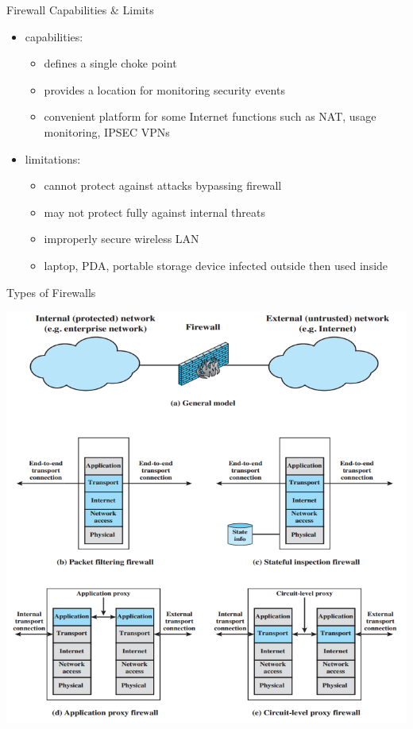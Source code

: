 \documentclass{beamer}
\begin{document}
\begin{frame}{Firewall Capabilities \& Limits}
  \begin{itemize}
  \item capabilities: 
    \begin{itemize}
    \item defines a single choke point 
    \item provides a location for monitoring security events 
    \item convenient platform for some Internet functions such as 
    NAT, usage monitoring, IPSEC VPNs 
    \end{itemize}
  \item limitations: 
    \begin{itemize}
    \item cannot protect against attacks bypassing firewall 
    \item may not protect fully against internal threats 
    \item improperly secure wireless LAN 
    \item laptop, PDA, portable storage device infected outside 
    then used inside
    \end{itemize}
  \end{itemize}
\end{frame}

\begin{frame}{Types of Firewalls}
  
  \begin{center}
    \includegraphics[width=0.6\linewidth]{firewall-type}
  \end{center}
\end{frame}
\end{document}
